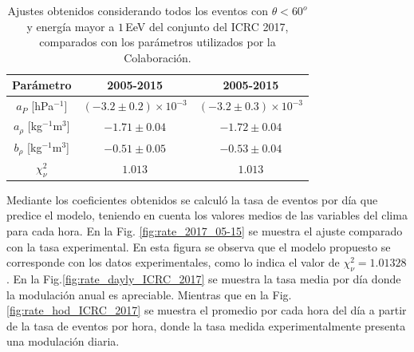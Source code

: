         \begin{table}[H]
            \centering
            \begin{tabular}{c|c|c}
            {Parámetro}                 & {2005-2015}                   & {2005-2015}    \cite{aab2017impact}              \\ \hline \hline
            $a_P$ [hPa$^{-1}$]          & $(-3.2 \pm 0.2)\times 10^{-3}$& $(-3.2 \pm 0.3)\times 10^{-3}$    \\ \hline
            $a_\rho$ [kg$^{-1}$m$^3$]   & $-1.71 \pm 0.04 $             & $-1.72 \pm 0.04$                  \\ \hline
            $b_\rho$ [kg$^{-1}$m$^3$]   & $-0.51 \pm 0.05$              & $-0.53 \pm 0.04$                  \\ \hline
            $\chi^2_\nu$                & $1.013$                       & $1.013$                           \\ 
            \end{tabular} 
            \caption{Ajustes obtenidos considerando todos los eventos con $\theta<60^o$ y energía mayor a $1\,$EeV del conjunto del ICRC 2017, comparados con los parámetros utilizados por la Colaboración.} \label{tabla:parametros_ICRC_2017}
        \end{table}

        Mediante los coeficientes obtenidos se calculó la tasa de eventos por día que predice el modelo, teniendo en cuenta los valores medios de las variables del clima para cada hora. En la Fig. \ref{fig:rate_2017_05-15} se muestra el ajuste comparado con la tasa experimental. En esta figura se observa que el modelo propuesto se corresponde con los datos experimentales, como lo indica el valor de $\chi^2_\nu=1.01328$. En la Fig.\ref{fig:rate_dayly_ICRC_2017} se muestra la tasa media por día donde la modulación anual es apreciable. Mientras que en la Fig.\ref{fig:rate_hod_ICRC_2017} se muestra el promedio por cada hora del día a partir de la tasa de eventos por hora, donde la tasa medida experimentalmente presenta una modulación diaria. 
        

